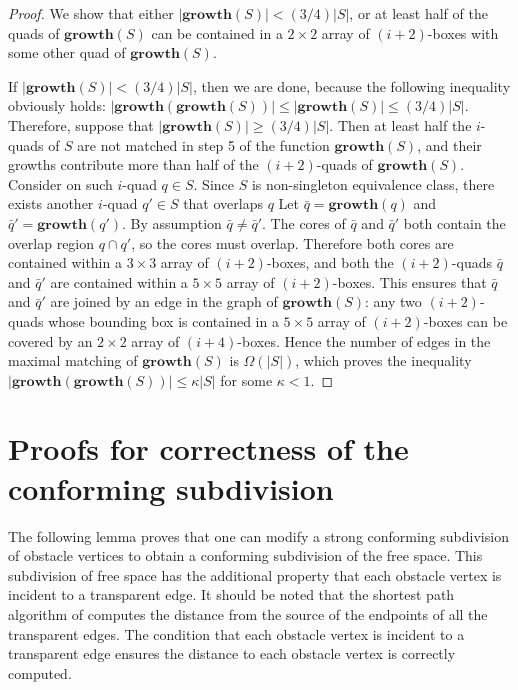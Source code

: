 \begin{proof}
We show that either $|\mathbf{growth}(S)| < (3/4)|S|$, or at least half of the quads of $\mathbf{growth}(S)$ can be contained in a $2 \times 2$ array of $(i+2)$-boxes with some other quad of $\mathbf{growth}(S)$. 

If $|\mathbf{growth}(S)| < (3/4)|S|$, then we are done, because the following inequality obviously holds: $|\mathbf{growth}(\mathbf{growth}(S))| \leq |\mathbf{growth}(S)| \leq (3/4)|S|$. Therefore, suppose that $|\mathbf{growth}(S)| \geq (3/4)|S|$. Then at least half the $i$-quads of $S$ are not matched in step 5 of the function $\mathbf{growth}(S)$, and their growths contribute more than half of the $(i+2)$-quads of $\mathbf{growth}(S)$. Consider on such $i$-quad $q\in S$. Since $S$ is non-singleton equivalence class, there exists another $i$-quad $q'\in S$ that overlaps $q$ Let $\bar{q}=\mathbf{growth}(q)$ and $\bar{q}' = \mathbf{growth}(q')$. By assumption $\bar{q} \neq \bar{q}'$. The cores of $\bar{q}$ and $\bar{q}'$ both contain the overlap region $q\cap q'$, so the cores must overlap. Therefore both cores are contained within a $3 \times 3$ array of $(i+2)$-boxes, and both the $(i+2)$-quads $\bar{q}$ and $\bar{q}'$ are contained within a $5 \times 5$ array of $(i+2)$-boxes. This ensures that $\bar{q}$ and $\bar{q}'$ are joined by an edge in the graph of $\mathbf{growth}(S)$: any two $(i+2)$-quads whose bounding box is contained in a $5 \times 5$ array of $(i+2)$-boxes can be covered by an $2 \times 2$ array of $(i+4)$-boxes. Hence the number of edges in the maximal matching of $\mathbf{growth}(S)$ is $\Omega(|S|)$, which proves the inequality $|\mathbf{growth}(\mathbf{growth}(S))| \leq \kappa|S|$ for some $\kappa < 1$.
\end{proof}

\section{Proofs for correctness of the conforming subdivision}

The following lemma proves that one can modify a strong conforming subdivision of 
obstacle vertices to obtain a conforming subdivision of the free space. This 
subdivision of free space has the additional property that each obstacle vertex is 
incident to a transparent edge. It should be noted that the shortest path algorithm of 
\cite{HershbergerS99} computes the distance from the source of the endpoints of all 
the transparent edges. The condition that each obstacle vertex is incident to a 
transparent edge ensures the distance to each obstacle vertex is correctly computed.


